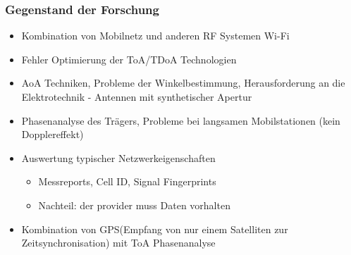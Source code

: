 \subsubsection{Gegenstand der Forschung}
\begin{itemize}
\item Kombination von Mobilnetz und anderen RF Systemen Wi-Fi
\item Fehler Optimierung der ToA/TDoA Technologien
\item AoA Techniken, Probleme der Winkelbestimmung, Herausforderung an die Elektrotechnik - Antennen mit synthetischer Apertur
\item Phasenanalyse des Trägers, Probleme bei langsamen Mobilstationen (kein Dopplereffekt)
\item Auswertung typischer Netzwerkeigenschaften
\begin{itemize}
\item Messreports, Cell ID, Signal Fingerprints
\item Nachteil: der provider muss Daten vorhalten
\end{itemize}
\item Kombination von GPS(Empfang von nur einem Satelliten zur Zeitsynchronisation) mit ToA Phasenanalyse
\end{itemize}
